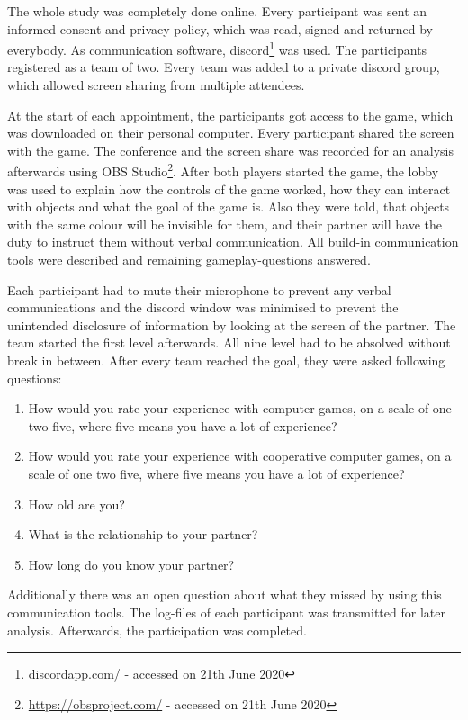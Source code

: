 
The whole study was completely done online.
Every participant was sent an informed consent and privacy policy, which was read, signed and returned by everybody.
As communication software, discord\footnote{\url{discordapp.com/} - accessed on 21th June 2020} was used. The participants registered as a team of two. 
Every team was added to a private discord group, which allowed screen sharing from multiple attendees.

At the start of each appointment, the participants got access to the game, which was downloaded on their personal computer.
Every participant shared the screen with the game. The conference and the screen share was recorded for an analysis afterwards using OBS Studio\footnote{\url{https://obsproject.com/} - accessed on 21th June 2020}.
After both players started the game, the lobby was used to explain how the controls of the game worked, how they can interact with objects and what the goal of the game is. Also they were told, that objects with the same colour will be invisible for them, and their partner will have the duty to instruct them without verbal communication.
All build-in communication tools were described and remaining gameplay-questions answered.

Each participant had to mute their microphone to prevent any verbal communications and the discord window was minimised to prevent the unintended disclosure of information by looking at the screen of the partner.
The team started the first level afterwards. All nine level had to be absolved without break in between.
After every team reached the goal, they were asked following questions:

\begin{enumerate}
    \item How would you rate your experience with computer games, on a scale of one two five, where five means you have a lot of experience?
    \item How would you rate your experience with cooperative computer games, on a scale of one two five, where five means you have a lot of experience?
    \item How old are you?
    \item What is the relationship to your partner?
    \item How long do you know your partner?
\end{enumerate}

Additionally there was an open question about what they missed by using this communication tools.
The log-files of each participant was transmitted for later analysis.
Afterwards, the participation was completed.

